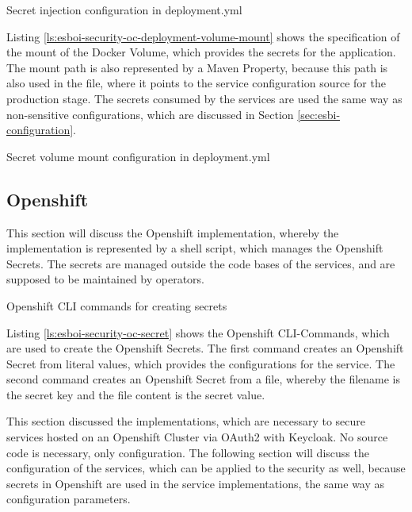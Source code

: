 \begin{listing}[h]
	\caption{Secret injection configuration in deployment.yml}
	\label{ls:esboi-security-oc-deployment-volume-secret}
\end{listing}

Listing \vref{ls:esboi-security-oc-deployment-volume-mount} shows the specification of the mount of the Docker Volume, which provides the secrets for the application. The mount path is also represented by a Maven Property, because this path is also used in the  file, where it points to the service configuration source for the production stage. The secrets consumed by the services are used the same way as non-sensitive configurations, which are discussed in Section \vref{sec:esbi-configuration}.

\begin{listing}[h]
	\caption{Secret volume mount configuration in deployment.yml}
	\label{ls:esboi-security-oc-deployment-volume-mount}
\end{listing}

\subsection{Openshift}
\label{sec:esbi-security-openshift}
This section will discuss the Openshift implementation, whereby the implementation is represented by a shell script, which manages the Openshift Secrets. The secrets are managed outside the code bases of the services, and are supposed to be maintained by operators.

\begin{listing}[h]
	\caption{Openshift CLI commands for creating secrets}
	\label{ls:esboi-security-oc-secret}
\end{listing}
	
Listing \vref{ls:esboi-security-oc-secret} shows the Openshift CLI-Commands, which are used to create the Openshift Secrets. The first command creates an Openshift Secret from literal values, which provides the configurations for the service. The second command creates an Openshift Secret from a file, whereby the filename is the secret key and the file content is the secret value. 
\newpage

This section discussed the implementations, which are necessary to secure services hosted on an Openshift Cluster via OAuth2 with Keycloak. No source code is necessary, only configuration. The following section will discuss the configuration of the services, which can be applied to the security as well, because secrets in Openshift are used in the service implementations, the same way as configuration parameters.

